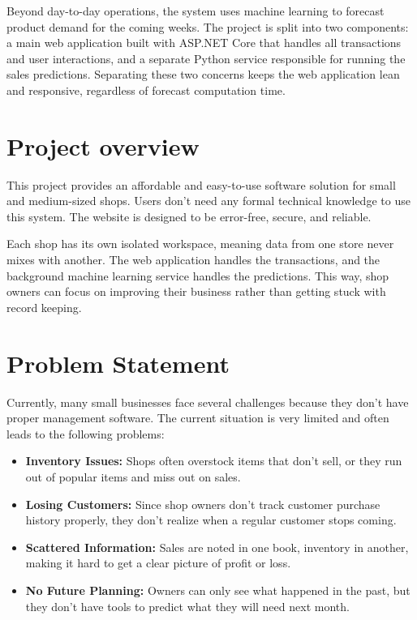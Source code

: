 \documentclass[12pt,a4paper]{report}
\begin{document}
Beyond day-to-day operations, the system uses machine learning to forecast product demand for the coming weeks. The project is split into two components: a main web application built with ASP.NET Core that handles all transactions and user interactions, and a separate Python service responsible for running the sales predictions. Separating these two concerns keeps the web application lean and responsive, regardless of forecast computation time.

\section{Project overview}
This project provides an affordable and easy-to-use software solution for small and medium-sized shops. Users don't need any formal technical knowledge to use this system. The website is designed to be error-free, secure, and reliable. 

Each shop has its own isolated workspace, meaning data from one store never mixes with another. The web application handles the transactions, and the background machine learning service handles the predictions. This way, shop owners can focus on improving their business rather than getting stuck with record keeping.

\section{Problem Statement}
Currently, many small businesses face several challenges because they don't have proper management software. The current situation is very limited and often leads to the following problems:
\begin{itemize}
    \item \textbf{Inventory Issues:} Shops often overstock items that don't sell, or they run out of popular items and miss out on sales.
    \item \textbf{Losing Customers:} Since shop owners don't track customer purchase history properly, they don't realize when a regular customer stops coming.
    \item \textbf{Scattered Information:} Sales are noted in one book, inventory in another, making it hard to get a clear picture of profit or loss.
    \item \textbf{No Future Planning:} Owners can only see what happened in the past, but they don't have tools to predict what they will need next month.
\end{itemize}
\end{document}

